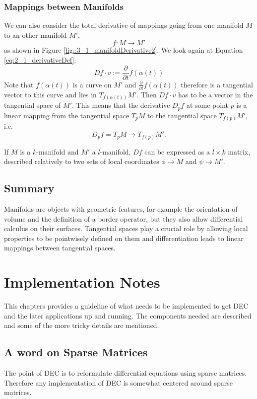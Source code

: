 \subsubsection*{Mappings between Manifolds}
\label{sec:derivativeBetweenMfs}
We can also consider the total derivative of mappings going from one manifold $M$ to an other manifold $M'$,
\[f:M\to M'\]
as shown in Figure \ref{fig::3_1_manifoldDerivative2}. We look again at Equation \ref{eq:2_1_derivativeDef}:
\[Df \cdot v := \frac{\partial}{\partial t} f(\alpha(t))\]
Note that $f(\alpha(t))$ is a curve on $M'$ and $\frac{\partial}{\partial t}f(\alpha(t))$ therefore is a tangential vector to this curve and lies in $T_{f(\alpha(t))}M'$. Then $Df\cdot v$ has to be a vector in the tangential space of $M'$. This means that the derivative $D_pf$ at some point $p$ is a linear mapping from the tangential space $T_pM$  to the tangential space $T_{f(p)} M'$, i.e. 
\[D_p f = T_p M \rightarrow T_{f(p)} M'.\] 

If $M$ is a $k$-manifold and $M'$ a $l$-manifold, $Df$ can be expressed as a $l\times k$ matrix, described relatively to two sets of local coordinates $\phi \rightarrow M$ and $\psi \rightarrow M'$.

\subsection{Summary}
Manifolds are objects with geometric features, for example the orientation of volume and the definition of a border operator, but they also allow differential calculus on their surfaces. Tangential spaces play a crucial role by allowing local properties to be pointwisely defined on them and differentiation leads to linear mappings between tangential spaces.




\newpage
\section{Implementation Notes}
This chapters provides a guideline of what needs to be implemented to get DEC and the later applications up and running. The components needed are described and some of the more tricky details are mentioned.

\subsection{A word on Sparse Matrices}
The point of DEC is to reformulate differential equations using sparse matrices. Therefore any implementation of DEC is somewhat centered around sparse matrices.

